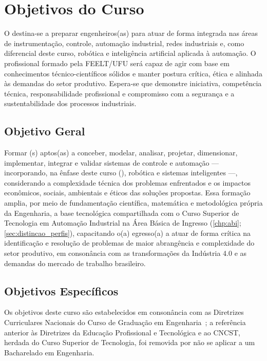 \chapter{Objetivos do Curso}
\label{chp:objetivos}

O \ppccurso destina-se a preparar engenheiros(as) para atuar de forma integrada nas áreas de instrumentação, controle, automação industrial, redes industriais e, como diferencial deste curso, robótica e inteligência artificial aplicada à automação. O profissional formado pela FEELT/UFU será capaz de agir com base em conhecimentos técnico-científicos sólidos e manter postura crítica, ética e alinhada às demandas do setor produtivo. Espera-se que demonstre iniciativa, competência técnica, responsabilidade profissional e compromisso com a segurança e a sustentabilidade dos processos industriais.

\section{Objetivo Geral}

Formar \ppctitulacao(s) aptos(as) a conceber, modelar, analisar, projetar, dimensionar, implementar, integrar e validar sistemas de controle e automação — incorporando, na ênfase deste curso (\ppcenfasecurricular), robótica e sistemas inteligentes —, considerando a complexidade técnica dos problemas enfrentados e os impactos econômicos, sociais, ambientais e éticos das soluções propostas. Essa formação amplia, por meio de fundamentação científica, matemática e metodológica própria da Engenharia, a base tecnológica compartilhada com o Curso Superior de Tecnologia em Automação Industrial na Área Básica de Ingresso (\autoref{chp:abi}; \autoref{sec:distincao_perfis}), capacitando o(a) egresso(a) a atuar de forma crítica na identificação e resolução de problemas de maior abrangência e complexidade do setor produtivo, em consonância com as transformações da Indústria 4.0 e as demandas do mercado de trabalho brasileiro.

\section{Objetivos Específicos}

Os objetivos deste curso são estabelecidos em consonância com as Diretrizes Curriculares Nacionais do Curso de Graduação em Engenharia~\cite{cne_ces_2_2019,cne_ces_1_2021}; a referência anterior às Diretrizes da Educação Profissional e Tecnológica e ao CNCST, herdada do Curso Superior de Tecnologia, foi removida por não se aplicar a um Bacharelado em Engenharia.


